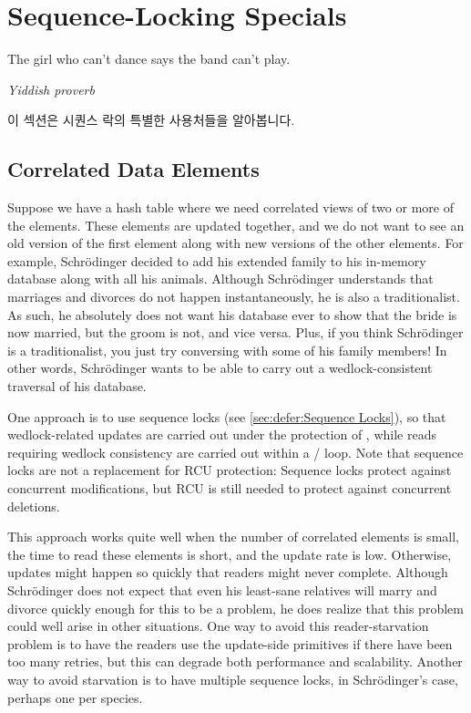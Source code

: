
\section{Sequence-Locking Specials}
\label{sec:together:Sequence-Locking Specials}
%
\epigraph{The girl who can't dance says the band can't play.}
	 {\emph{Yiddish proverb}}

이 섹션은 시퀀스 락의 특별한 사용처들을 알아봅니다.

\iffalse

This section looks at some special uses of sequence locks.

\fi

\subsection{Correlated Data Elements}
\label{sec:together:Correlated Data Elements}

Suppose we have a hash table where we need correlated views of two or
more of the elements.
These elements are updated together, and we do not want to see an old
version of the first element along with new versions of the other
elements.
For example, Schr\"odinger decided to add his extended family to his
in-memory database along with all his animals.
Although Schr\"odinger understands that marriages and divorces do not
happen instantaneously, he is also a traditionalist.
As such, he absolutely does not want his database ever to show that the
bride is now married, but the groom is not, and vice versa.
Plus, if you think Schr\"odinger is a traditionalist, you just
try conversing with some of his family members!
In other words, Schr\"odinger wants to be able to carry out a
wedlock-consistent traversal of his database.

One approach is to use sequence locks
(see \cref{sec:defer:Sequence Locks}),
so that wedlock-related updates are carried out under the
protection of , while reads requiring
wedlock consistency are carried out within
a  /  loop.
Note that sequence locks are not a replacement for RCU protection:
Sequence locks protect against concurrent modifications, but RCU
is still needed to protect against concurrent deletions.

This approach works quite well when the number of correlated elements is
small, the time to read these elements is short, and the update rate is
low.
Otherwise, updates might happen so quickly that readers might never complete.
Although Schr\"odinger does not expect that even his least-sane relatives
will marry and divorce quickly enough for this to be a problem,
he does realize that this problem could well arise in other situations.
One way to avoid this reader-starvation problem is to have the readers
use the update-side primitives if there have been too many retries,
but this can degrade both performance and scalability.
Another way to avoid starvation is to have multiple sequence locks,
in Schr\"odinger's case, perhaps one per species.

